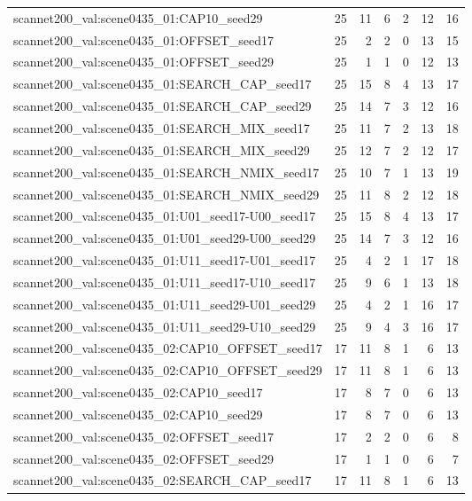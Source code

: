 \begin{table}[t]
\begin{tabular}{lrrrrrr}
scannet200\_val:scene0435\_01:CAP10\_seed29 & 25 & 11 & 6 & 2 & 12 & 16 \\
scannet200\_val:scene0435\_01:OFFSET\_seed17 & 25 & 2 & 2 & 0 & 13 & 15 \\
scannet200\_val:scene0435\_01:OFFSET\_seed29 & 25 & 1 & 1 & 0 & 12 & 13 \\
scannet200\_val:scene0435\_01:SEARCH\_CAP\_seed17 & 25 & 15 & 8 & 4 & 13 & 17 \\
scannet200\_val:scene0435\_01:SEARCH\_CAP\_seed29 & 25 & 14 & 7 & 3 & 12 & 16 \\
scannet200\_val:scene0435\_01:SEARCH\_MIX\_seed17 & 25 & 11 & 7 & 2 & 13 & 18 \\
scannet200\_val:scene0435\_01:SEARCH\_MIX\_seed29 & 25 & 12 & 7 & 2 & 12 & 17 \\
scannet200\_val:scene0435\_01:SEARCH\_NMIX\_seed17 & 25 & 10 & 7 & 1 & 13 & 19 \\
scannet200\_val:scene0435\_01:SEARCH\_NMIX\_seed29 & 25 & 11 & 8 & 2 & 12 & 18 \\
scannet200\_val:scene0435\_01:U01\_seed17-U00\_seed17 & 25 & 15 & 8 & 4 & 13 & 17 \\
scannet200\_val:scene0435\_01:U01\_seed29-U00\_seed29 & 25 & 14 & 7 & 3 & 12 & 16 \\
scannet200\_val:scene0435\_01:U11\_seed17-U01\_seed17 & 25 & 4 & 2 & 1 & 17 & 18 \\
scannet200\_val:scene0435\_01:U11\_seed17-U10\_seed17 & 25 & 9 & 6 & 1 & 13 & 18 \\
scannet200\_val:scene0435\_01:U11\_seed29-U01\_seed29 & 25 & 4 & 2 & 1 & 16 & 17 \\
scannet200\_val:scene0435\_01:U11\_seed29-U10\_seed29 & 25 & 9 & 4 & 3 & 16 & 17 \\
scannet200\_val:scene0435\_02:CAP10\_OFFSET\_seed17 & 17 & 11 & 8 & 1 & 6 & 13 \\
scannet200\_val:scene0435\_02:CAP10\_OFFSET\_seed29 & 17 & 11 & 8 & 1 & 6 & 13 \\
scannet200\_val:scene0435\_02:CAP10\_seed17 & 17 & 8 & 7 & 0 & 6 & 13 \\
scannet200\_val:scene0435\_02:CAP10\_seed29 & 17 & 8 & 7 & 0 & 6 & 13 \\
scannet200\_val:scene0435\_02:OFFSET\_seed17 & 17 & 2 & 2 & 0 & 6 & 8 \\
scannet200\_val:scene0435\_02:OFFSET\_seed29 & 17 & 1 & 1 & 0 & 6 & 7 \\
scannet200\_val:scene0435\_02:SEARCH\_CAP\_seed17 & 17 & 11 & 8 & 1 & 6 & 13 \\

\end{tabular}
\end{table}
